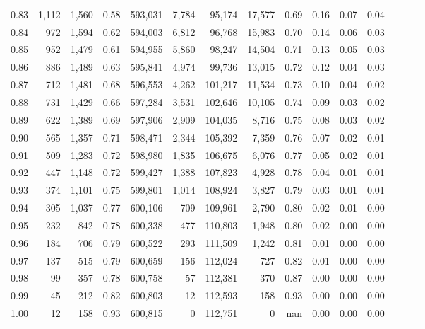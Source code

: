 \begin{tabular}{rrrrrrrrrrrrrrr}
0.83 &   1,112 &  1,560 &  0.58 &  593,031 &    7,784 &   95,174 &   17,577 &  0.69 &  0.16 &  0.07 &      0.04 \\
0.84 &     972 &  1,594 &  0.62 &  594,003 &    6,812 &   96,768 &   15,983 &  0.70 &  0.14 &  0.06 &      0.03 \\
0.85 &     952 &  1,479 &  0.61 &  594,955 &    5,860 &   98,247 &   14,504 &  0.71 &  0.13 &  0.05 &      0.03 \\
0.86 &     886 &  1,489 &  0.63 &  595,841 &    4,974 &   99,736 &   13,015 &  0.72 &  0.12 &  0.04 &      0.03 \\
0.87 &     712 &  1,481 &  0.68 &  596,553 &    4,262 &  101,217 &   11,534 &  0.73 &  0.10 &  0.04 &      0.02 \\
0.88 &     731 &  1,429 &  0.66 &  597,284 &    3,531 &  102,646 &   10,105 &  0.74 &  0.09 &  0.03 &      0.02 \\
0.89 &     622 &  1,389 &  0.69 &  597,906 &    2,909 &  104,035 &    8,716 &  0.75 &  0.08 &  0.03 &      0.02 \\
0.90 &     565 &  1,357 &  0.71 &  598,471 &    2,344 &  105,392 &    7,359 &  0.76 &  0.07 &  0.02 &      0.01 \\
0.91 &     509 &  1,283 &  0.72 &  598,980 &    1,835 &  106,675 &    6,076 &  0.77 &  0.05 &  0.02 &      0.01 \\
0.92 &     447 &  1,148 &  0.72 &  599,427 &    1,388 &  107,823 &    4,928 &  0.78 &  0.04 &  0.01 &      0.01 \\
0.93 &     374 &  1,101 &  0.75 &  599,801 &    1,014 &  108,924 &    3,827 &  0.79 &  0.03 &  0.01 &      0.01 \\
0.94 &     305 &  1,037 &  0.77 &  600,106 &      709 &  109,961 &    2,790 &  0.80 &  0.02 &  0.01 &      0.00 \\
0.95 &     232 &    842 &  0.78 &  600,338 &      477 &  110,803 &    1,948 &  0.80 &  0.02 &  0.00 &      0.00 \\
0.96 &     184 &    706 &  0.79 &  600,522 &      293 &  111,509 &    1,242 &  0.81 &  0.01 &  0.00 &      0.00 \\
0.97 &     137 &    515 &  0.79 &  600,659 &      156 &  112,024 &      727 &  0.82 &  0.01 &  0.00 &      0.00 \\
0.98 &      99 &    357 &  0.78 &  600,758 &       57 &  112,381 &      370 &  0.87 &  0.00 &  0.00 &      0.00 \\
0.99 &      45 &    212 &  0.82 &  600,803 &       12 &  112,593 &      158 &  0.93 &  0.00 &  0.00 &      0.00 \\
1.00 &      12 &    158 &  0.93 &  600,815 &        0 &  112,751 &        0 &   nan &  0.00 &  0.00 &      0.00 \\
\bottomrule
\end{tabular}
